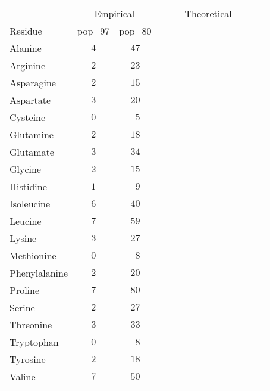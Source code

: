 \documentclass[12pt]{article}
\begin{document}
\begin{center}
\footnotesize
\begin{tabular}{lcccccccc}
&  \multicolumn{2}{c}{Empirical} & ~~~& \multicolumn{2}{c}{Theoretical}\\\cline{2-3}\cline{5-6}
Residue & pop_97 & pop_80 \\
\hline Alanine   & $4$ & $47$ \\
Arginine         & $2$ & $23$ \\
Asparagine       & $2$ & $15$ \\
Aspartate        & $3$ & $20$ \\
Cysteine         & $0$ & $\phantom{0}5$ \\
Glutamine        & $2$ & $18$ \\
Glutamate        & $3$ & $34$ \\
Glycine          & $2$ & $15$ \\
Histidine        & $1$ & $\phantom{0}9$ \\
Isoleucine       & $6$ & $40$ \\
Leucine          & $7$ & $59$ \\
Lysine           & $3$ & $27$ \\
Methionine       & $0$ & $\phantom{0}8$ \\
Phenylalanine    & $2$ & $20$ \\
Proline          & $7$ & $80$ \\
Serine           & $2$ & $27$ \\
Threonine        & $3$ & $33$ \\
Tryptophan       & $0$ & $\phantom{0}8$ \\
Tyrosine         & $2$ & $18$ \\
Valine           & $7$ & $50$ \\
\hline
\end{tabular}
\end{center}
\end{document}
